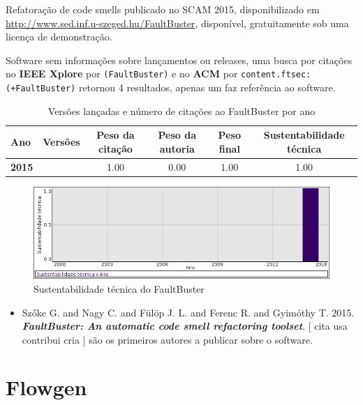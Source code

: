 Refatoração de code smells
publicado no SCAM 2015,
disponibilizado em \url{http://www.sed.inf.u-szeged.hu/FaultBuster},
disponível,
gratuitamente
sob uma licença de demonstração.

Software sem informações sobre lançamentos ou releases,
uma busca por citações no {\bf IEEE Xplore} por
\texttt{(FaultBuster)}
e no {\bf ACM} por
\texttt{content.ftsec:(+FaultBuster)}
retornou
4 resultados,
apenas um faz referência ao software.


\begin{table}[H]
\caption{Versões lançadas e número de citações ao FaultBuster por ano}
\centering
\begin{tabular}{| l | c | c | c | c | c |}
  \hline
  Ano & Versões & Peso da citação & Peso da autoria & Peso final & Sustentabilidade técnica \\
  \hline
            {\bf 2015}
          &
          
          &
          1.00
          &
          0.00
          &
          1.00
          &
            {\color{blue} 1.00}
          \\
\hline
\end{tabular}
\end{table}

\begin{figure}[h]
  \center
  \includegraphics[scale=0.50]{imagens/softwares-charts/faultbuster.png}
  \caption{Sustentabilidade técnica do FaultBuster}
\end{figure}


\begin{itemize}
\item Szőke G. and Nagy C. and Fülöp J. L. and Ferenc R. and Gyimóthy T.
      2015.
        \textbf{\textit{ FaultBuster: An automatic code smell refactoring toolset}}.
      [
          cita
          usa
          contribui
          cria
      ]
são os primeiros autores a publicar sobre o software.
\end{itemize}
\section{Flowgen}

